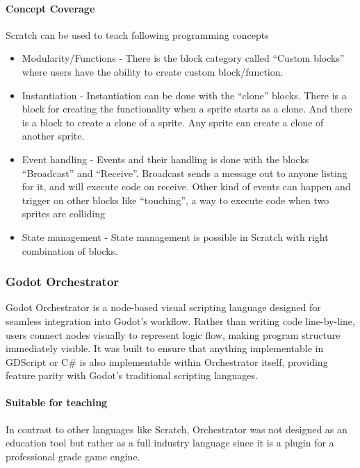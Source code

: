 \paragraph{Concept Coverage}
Scratch can be used to teach following programming concepts


\begin{itemize}
    \item Modularity/Functions - There is the block category called ``Custom blocks'' where users have the ability to create custom block/function.
    \item Instantiation - Instantiation can be done with the ``clone'' blocks.
    There is a block for creating the functionality when a sprite starts as a clone.
    And there is a block to create a clone of a sprite.
    Any sprite can create a clone of another sprite.
    \item Event handling - Events and their handling is done with the blocks “Broadcast” and “Receive”.
    Broadcast sends a message out to anyone listing for it, and will execute code on receive.
    Other kind of events can happen and trigger on other blocks like “touching”, a way to execute code when two sprites are colliding
    \item State management - State management is possible in Scratch with right combination of blocks.
\end{itemize}

\subsubsection{Godot Orchestrator}
Godot Orchestrator is a node-based visual scripting language designed for seamless integration into Godot's workflow.
Rather than writing code line-by-line, users connect nodes visually to represent logic flow, making program structure immediately visible.
It was built to ensure that anything implementable in GDScript or C\# is also implementable within Orchestrator itself, providing feature parity with Godot's traditional scripting languages.

\paragraph{Suitable for teaching}

In contrast to other languages like Scratch, Orchestrator was not designed as an education tool but rather as a full industry language since it is a plugin for a professional grade game engine.

